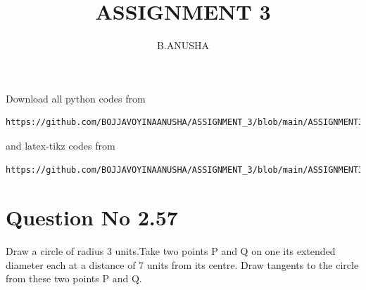 \documentclass[journal,12pt,twocolumn]{IEEEtran}
\begin{document}
     \def\rightbox#1{\makebox[0in][r]{#1}}
     \def\centbox#1{\makebox[0in]{#1}}
     \def\topbox#1{\raisebox{-\baselineskip}[0in][0in]{#1}}
     \def\midbox#1{\raisebox{-0.5\baselineskip}[0in][0in]{#1}}
\vspace{3cm}
\title{ASSIGNMENT 3}
\author{B.ANUSHA}
\maketitle
\newpage
\bigskip
\renewcommand{\thefigure}{\theenumi}
\renewcommand{\thetable}{\theenumi}
Download all python codes from 
\begin{lstlisting}
https://github.com/BOJJAVOYINAANUSHA/ASSIGNMENT_3/blob/main/ASSIGNMENT3/assignment3.py
\end{lstlisting}
%
and latex-tikz codes from 
%
\begin{lstlisting}
https://github.com/BOJJAVOYINAANUSHA/ASSIGNMENT_3/blob/main/ASSIGNMENT3/ASSIGNMENT3.tex
\end{lstlisting}
%
\section{Question No 2.57}
Draw a circle of radius 3 units.Take two points P and Q on one its extended diameter each at a distance of 7 units from its centre. Draw tangents to the circle from these two points P and Q. 
%
\end{document}
